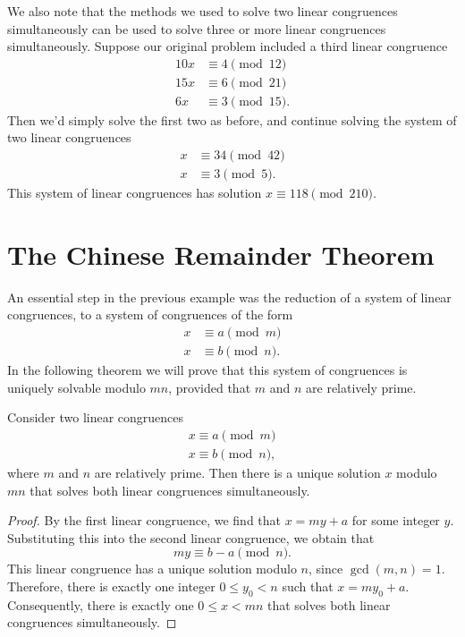 We also note that the methods we used to solve two linear congruences simultaneously can be used to solve three or more linear congruences simultaneously. Suppose our original problem included a third linear congruence
\begin{align*}
  10x & \equiv 4 \pmod{12} \\
  15x & \equiv 6 \pmod{21} \\
  6x & \equiv 3 \pmod{15}.
\end{align*}
Then we'd simply solve the first two as before, and continue solving the system of two linear congruences
\begin{align*}
  x & \equiv 34 \pmod{42} \\
  x & \equiv 3 \pmod {5}.
\end{align*}
This system of linear congruences has solution $x\equiv 118 \pmod{210}$.

\section{The Chinese Remainder Theorem}

An essential step in the previous example was the reduction of a system of linear congruences, to a system of congruences of the form
\begin{align*}
  x & \equiv a \pmod{m} \\
  x & \equiv b \pmod{n}.
\end{align*}
In the following theorem we will prove that this system of congruences is uniquely solvable modulo $mn$, provided that $m$ and $n$ are relatively prime.

\begin{theorem}\label{theorem:chinese-remainder-theorem}
  Consider two linear congruences
  \begin{align*}
    x\equiv a \pmod{m} \\
    x\equiv b \pmod{n},
  \end{align*}
  where $m$ and $n$ are relatively prime. Then there is a unique solution $x$ modulo $mn$ that solves both linear congruences simultaneously.
\end{theorem}

\begin{proof}
  By the first linear congruence, we find that $x=my+a$ for some integer $y$. Substituting this into the second linear congruence, we obtain that
  \begin{equation*}
    my\equiv b-a \pmod{n}.
  \end{equation*}
  This linear congruence has a unique solution modulo $n$, since $\gcd(m,n)=1$. Therefore, there is exactly one integer $0\leq y_0 < n$ such that $x=my_0 + a$. Consequently, there is exactly one $0\leq x < mn$ that solves both linear congruences simultaneously.
\end{proof}

